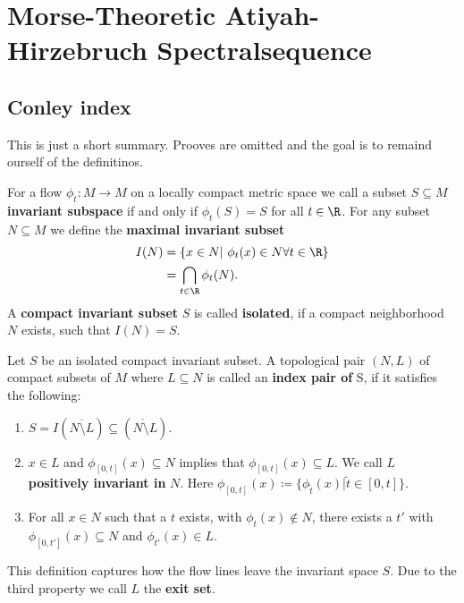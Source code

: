 \section{Morse-Theoretic Atiyah-Hirzebruch Spectralsequence}
\subsection{Conley index}
This is just a short summary. Prooves are omitted and the goal is to remaind ourself of the definitinos. 
\begin{definition}
	For a flow $\phi_t:M\to M$ on a locally compact metric space we call a subset $S\subseteq M$ \textbf{invariant subspace} if and only if $\phi_t(S)=S$ for all $t\in \R$. For any subset $N\subseteq M$ we define the \textbf{maximal invariant subset}
	\begin{align*}
		I(N)&=\{x\in N|~ \phi_t(x)\in N \forall t\in \R\}\\
		&=\bigcap_{t\in \R} \phi_t(N).
	\end{align*} A \textbf{compact invariant subset} $S$ is called \textbf{isolated}, if a compact neighborhood $N$ exists, such that $I(N)=S$.
\end{definition}
\begin{definition} \label{def: index pairs}
	Let $S$ be an isolated compact invariant subset. A topological pair $(N,L)$ of compact subsets of $M$ where $L\subseteq N$ is called an \textbf{index pair of }S, if it satisfies the following:
	\begin{enumerate}
		\item $S=I(\overline{N\setminus L})\subseteq (\mathring{N\setminus L})$.
		\item  $x\in L$ and $\phi_{[0,t]}(x)\subseteq N$ implies that  $\phi_{[0,t]}(x)\subseteq L$. We call $L$ \textbf{positively invariant in } $N$. Here $\phi_{[0,t]}(x)\coloneq\{ \phi_{\tilde{t}}(x)|\tilde{t}\in [0,t]\}$.
		\item For all $x\in N$ such that a $t$ exists, with $\phi_t(x)\not\in N$, there exists a $t'$ with $\phi_{[0,t']}(x)\subseteq N$ and $\phi_{t'}(x)\in L$.
	\end{enumerate}
	This definition captures how the flow lines leave the invariant space $S$. Due to the third property we call $L$ the \textbf{exit set}.
\end{definition}


